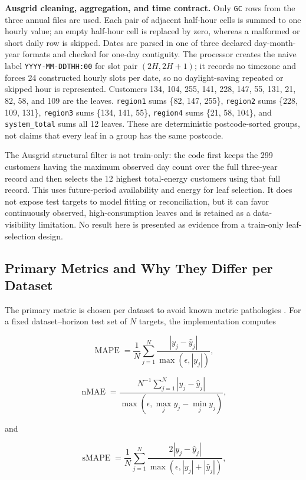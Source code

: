 \documentclass[electronics,article,submit,moreauthors]{Definitions/mdpi}
\begin{document}
\textbf{Ausgrid cleaning, aggregation, and time contract.} Only \texttt{GC} rows from the three annual files are used. Each pair of adjacent half-hour cells is summed to one hourly value; an empty half-hour cell is replaced by zero, whereas a malformed or short daily row is skipped. Dates are parsed in one of three declared day-month-year formats and checked for one-day contiguity. The processor creates the naive label \texttt{YYYY-MM-DDTHH:00} for slot pair \((2H,2H+1)\); it records no timezone and forces 24 constructed hourly slots per date, so no daylight-saving repeated or skipped hour is represented. Customers 134, 104, 255, 141, 228, 147, 55, 131, 21, 82, 58, and 109 are the leaves. \texttt{region1} sums \{82, 147, 255\}, \texttt{region2} sums \{228, 109, 131\}, \texttt{region3} sums \{134, 141, 55\}, \texttt{region4} sums \{21, 58, 104\}, and \texttt{system\_total} sums all 12 leaves. These are deterministic postcode-sorted groups, not claims that every leaf in a group has the same postcode.

The Ausgrid structural filter is not train-only: the code first keeps the 299 customers having the maximum observed day count over the full three-year record and then selects the 12 highest total-energy customers using that full record. This uses future-period availability and energy for leaf selection. It does not expose test targets to model fitting or reconciliation, but it can favor continuously observed, high-consumption leaves and is retained as a data-visibility limitation. No result here is presented as evidence from a train-only leaf-selection design.

\subsection{Primary Metrics and Why They Differ per Dataset}\label{primary-metrics-and-why-they-differ-per-dataset}

The primary metric is chosen per dataset to avoid known metric pathologies \cite{ref27}. For a fixed dataset--horizon test set of \(N\) targets, the implementation computes

\[
\operatorname{MAPE}=\frac{1}{N}\sum_{j=1}^{N}\frac{|y_j-\hat y_j|}{\max(\epsilon,|y_j|)},
\]

\[
\operatorname{nMAE}=\frac{N^{-1}\sum_{j=1}^{N}|y_j-\hat y_j|}
{\max\!\left(\epsilon,\max_j y_j-\min_j y_j\right)},
\]

and

\[
\operatorname{sMAPE}=\frac{1}{N}\sum_{j=1}^{N}
\frac{2|y_j-\hat y_j|}{\max(\epsilon,|y_j|+|\hat y_j|)},
\]
\end{document}
